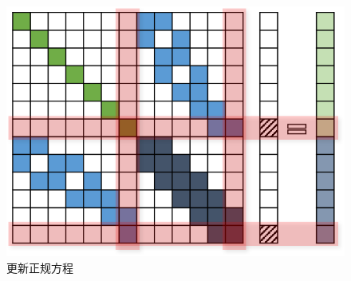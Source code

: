 \begin{figure}[htb!]
    \centering
    \includegraphics[scale=1]{Pictures/normal_eq_update.png}
    \caption{更新正规方程}
    \label{fig:normal_eq_update}
\end{figure}


